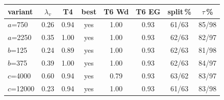 \begin{tabular}{lccccccc}
\toprule
variant & $\lambda_v$ & T4 & best & T6 Wd & T6 EG & split\,\% & $\tau$\,\%\\
\midrule
$a$=750 & 0.26 & 0.94 & yes & 1.00 & 0.93 & 61/63 & 85/98 \\
$a$=2250 & 0.35 & 1.00 & yes & 1.00 & 0.93 & 62/63 & 82/97 \\
$b$=125 & 0.24 & 0.89 & yes & 1.00 & 0.93 & 62/63 & 81/98 \\
$b$=375 & 0.39 & 1.00 & yes & 1.00 & 0.93 & 62/63 & 84/97 \\
$c$=4000 & 0.60 & 0.94 & yes & 0.79 & 0.93 & 63/62 & 83/97 \\
$c$=12000 & 0.23 & 0.94 & yes & 1.00 & 0.93 & 61/63 & 83/98 \\
\bottomrule
\end{tabular}
